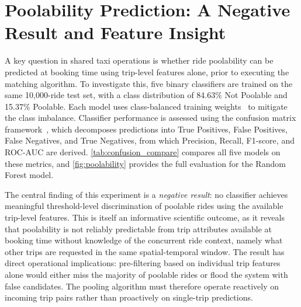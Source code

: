 \section{Poolability Prediction: A Negative Result and Feature Insight}
\label{sec:pool_eval}

A key question in shared taxi operations is whether ride poolability can be predicted at booking time using trip-level features alone, prior to executing the matching algorithm. To investigate this, five binary classifiers are trained on the same 10{,}000-ride test set, with a class distribution of 84.63\% Not Poolable and 15.37\% Poolable. Each model uses class-balanced training weights~\parencite{scikit-learn} to mitigate the class imbalance. Classifier performance is assessed using the confusion matrix framework~\parencite{powers2011evaluation,scikit-learn}, which decomposes predictions into True Positives, False Positives, False Negatives, and True Negatives, from which Precision, Recall, F1-score, and ROC-AUC are derived. \autoref{tab:confusion_compare} compares all five models on these metrics, and \autoref{fig:poolability} provides the full evaluation for the Random Forest model.

The central finding of this experiment is a \emph{negative result}: no classifier achieves meaningful threshold-level discrimination of poolable rides using the available trip-level features. This is itself an informative scientific outcome, as it reveals that poolability is not reliably predictable from trip attributes available at booking time without knowledge of the concurrent ride context, namely what other trips are requested in the same spatial-temporal window. The result has direct operational implications: pre-filtering based on individual trip features alone would either miss the majority of poolable rides or flood the system with false candidates. The pooling algorithm must therefore operate reactively on incoming trip pairs rather than proactively on single-trip predictions.

